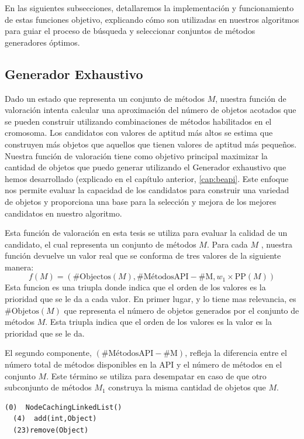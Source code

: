 En las siguientes subsecciones, detallaremos la implementación y funcionamiento de estas funciones objetivo, explicando cómo son utilizadas en nuestros algoritmos para guiar el proceso de búsqueda y seleccionar conjuntos de métodos generadores óptimos.

\subsection{Generador Exhaustivo}

Dado un estado que representa un conjunto de métodos $M$, nuestra función de valoración intenta calcular una aproximación del número de objetos acotados que se pueden construir utilizando combinaciones de métodos habilitados en el cromosoma. Los candidatos con valores de aptitud más altos se estima que construyen más objetos que aquellos que tienen valores de aptitud más pequeños.
Nuestra función de valoración tiene como objetivo principal maximizar la cantidad de objetos que puedo generar utilizando el Generador exhaustivo que hemos desarrollado (explicado en el capítulo anterior,  \ref{cap:beapi}. Este enfoque nos permite evaluar la capacidad de los candidatos para construir una variedad de objetos y proporciona una base para la selección y mejora de los mejores candidatos en nuestro algoritmo.

Esta función de valoración en esta tesis se utiliza para evaluar la calidad de un candidato, el cual representa un conjunto de métodos $M$. Para cada $M$ , nuestra función devuelve un valor real que se conforma de tres valores de la siguiente manera:
\begin{equation*}
f(M) = (\text{{\#Objectos}}(M), \text{{\#MétodosAPI}} - \text{{\#M}}, w_1 \times \text{{PP}}(M))
\end{equation*}
Esta funcion es una triupla donde indica que el orden de los valores es la prioridad que se le da a cada valor. 
En primer lugar, y lo tiene mas relevancia, es $\text{{\#Objetos}}(M)$ que representa el número de objetos generados por el conjunto de métodos $M$. Esta triupla indica que el orden de los valores es la  valor es la prioridad que se le da.

El segundo componente, $(\text{{\#MétodosAPI}} - \text{{\#M}})$, refleja la diferencia entre el número total de métodos disponibles en la API y el número de métodos en el conjunto $M$. Este término se utiliza para desempatar en caso de que otro subconjunto de métodos $M_1$ construya la misma cantidad de objetos que $M$.

\begin{lstlisting}[label=fig:NCLeqbuilders2, caption=Sufficient and minimal builders for NCL with more complex parameters than the ones in Figure \ref{fig:NCLbuilders}, captionpos=b, frame=tb, float=t]
  (0)  NodeCachingLinkedList()
  (4)  add(int,Object)
  (23)remove(Object)
\end{lstlisting}

